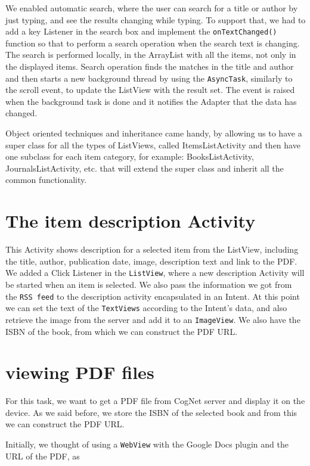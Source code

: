 \documentclass [a4paper, 11pt, oneside, final]{article}
\numberwithin{equation}{section}		%
\numberwithin{figure}{section}			%
\numberwithin{table}{section}				%
\begin{document}
We enabled automatic search, where the user can search for a title or author by just typing, and see the results changing while typing. To support that, we had to add a key Listener in the search box and implement the {\tt onTextChanged()} function so that to perform a search operation when the search text is changing. The search is performed locally, in the ArrayList with all the items, not only in the displayed items. Search operation finds the matches in the title and author and then starts a new background thread by using the {\tt AsyncTask}, similarly to the scroll event, to update the ListView with the result set. The event is raised when the background task is done and it notifies the Adapter that the data has changed.

Object oriented techniques and inheritance came handy, by allowing us to have a super class for all the types of ListViews, called ItemsListActivity and then have one subclass for each item category, for example: BooksListActivity, JournalsListActivity, etc. that will extend the super class and inherit all the common functionality.

\section {The item description Activity}
This Activity shows description for a selected item from the ListView, including the title, author, publication date, image, description text and link to the PDF. We added a Click Listener in the {\tt ListView}, where a new description Activity will be started when an item is selected. We also pass the information we got from the {\tt RSS feed} to the description activity encapsulated in an Intent. At this point we can set the text of the {\tt TextViews} according to the Intent's data, and also retrieve the image from the server and add it to an {\tt ImageView}. We also have the ISBN of the book, from which we can construct the PDF URL.


\section{viewing PDF files}
For this task, we want to get a PDF file from CogNet server and display it on the device. As we said before, we store the ISBN of the selected book and from this we can construct the PDF URL.

Initially, we thought of using a {\tt WebView} with the Google Docs plugin and the URL of the PDF, as
\end{document}
